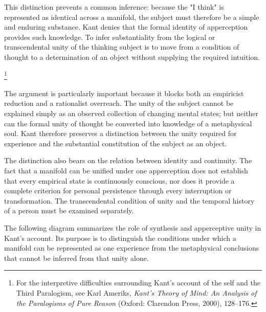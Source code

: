 This distinction prevents a common inference:
because the "I think" is represented as identical
across a manifold, the subject must therefore
be a simple and enduring substance. Kant denies
that the formal identity of apperception provides
such knowledge. To infer substantiality from
the logical or transcendental unity of the
thinking subject is to move from a condition
of thought to a determination of an object
without supplying the required intuition.

\footnote{For the interpretive difficulties surrounding
Kant's account of the self and the Third Paralogism,
see Karl Ameriks, \textit{Kant's Theory of Mind:
An Analysis of the Paralogisms of Pure Reason}
(Oxford: Clarendon Press, 2000), 128--176.}

\label{para:VS.B01.P01.C08.S10.SS07.P004}

The argument is particularly important because
it blocks both an empiricist reduction and a
rationalist overreach. The unity of the subject
cannot be explained simply as an observed
collection of changing mental states; but neither
can the formal unity of thought be converted
into knowledge of a metaphysical soul. Kant
therefore preserves a distinction between the
unity required for experience and the substantial
constitution of the subject as an object.

\label{para:VS.B01.P01.C08.S10.SS07.P005}

The distinction also bears on the relation
between identity and continuity. The fact that
a manifold can be unified under one apperception
does not establish that every empirical state
is continuously conscious, nor does it provide
a complete criterion for personal persistence
through every interruption or transformation.
The transcendental condition of unity and the
temporal history of a person must be examined
separately.

\label{para:VS.B01.P01.C08.S10.SS07.P006}

The following diagram summarizes the role of
synthesis and apperceptive unity in Kant's
account. Its purpose is to distinguish the
conditions under which a manifold can be
represented as one experience from the
metaphysical conclusions that cannot be
inferred from that unity alone.




